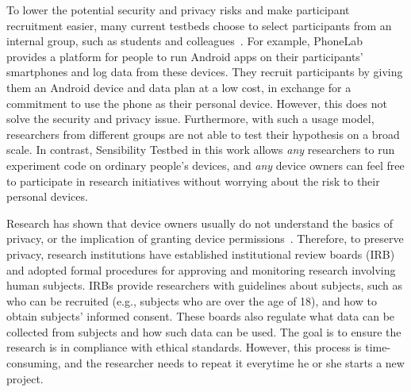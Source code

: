 To lower the potential security and privacy risks and make  
participant recruitment easier, many current testbeds choose to 
select participants from an internal group, such as students and 
colleagues~\cite{hao2013isleep, wang2012no, 
wang2013sensing}. For example, PhoneLab provides a platform for 
people to run Android apps on their participants' smartphones 
and log data from these devices. They recruit participants by 
giving them an Android device and data plan at a low cost, in 
exchange for a commitment to use the phone as their personal 
device. However, this does not solve the security and privacy issue. 
Furthermore, with such a usage model, researchers from different  
groups are not able to test their hypothesis on a broad scale.
In contrast, Sensibility Testbed in this work
allows \textit{any} researchers to run experiment code on ordinary people's 
devices, and \textit{any} device owners can feel free to 
participate in research initiatives without worrying about the risk 
to their personal devices.

Research has shown that device owners usually do not understand the 
basics of privacy, or the implication of granting device 
permissions~\cite{camp2015respecting}. 
Therefore, to preserve privacy, research institutions have established 
institutional review boards (IRB) \cite{irb} and adopted formal 
procedures for approving and monitoring research involving 
human subjects. IRBs provide researchers with guidelines about 
subjects, such as who can be recruited (e.g., subjects
who are over the age of 18), and 
how to obtain subjects' informed consent. These boards also 
regulate what data can be collected from subjects and how 
such data can be used. The goal is
to ensure the research is in compliance with ethical standards. 
However, this process is time-consuming, and the researcher needs 
to repeat it everytime he or she starts a new project. 

